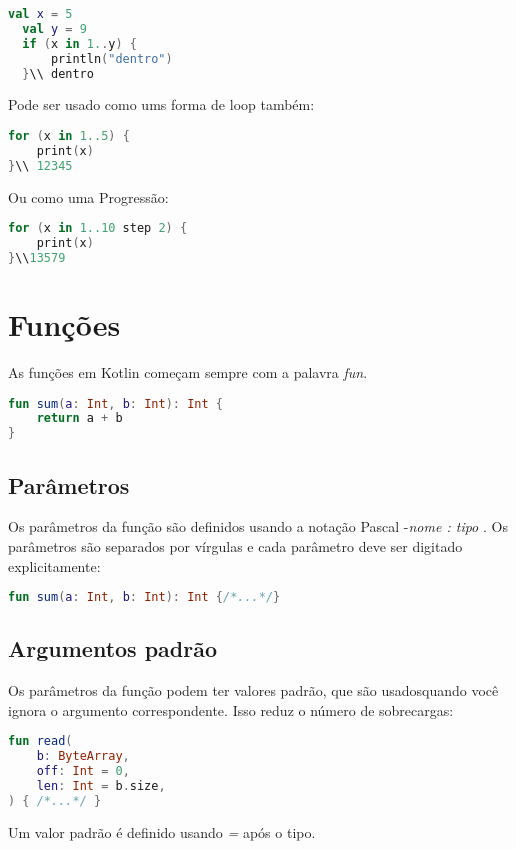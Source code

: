 \begin{lstlisting}[label={lst:example1}, language=Kotlin]
  val x = 5
  val y = 9
  if (x in 1..y) {
      println("dentro")
  }\\ dentro
\end{lstlisting}
Pode ser usado como ums forma de loop também:
\begin{lstlisting}[label={lst:example1}, language=Kotlin]
  for (x in 1..5) {
    print(x)
}\\ 12345
\end{lstlisting}
Ou como uma Progressão:
\begin{lstlisting}[label={lst:example1}, language=Kotlin]
  for (x in 1..10 step 2) {
    print(x)
}\\13579
\end{lstlisting}


\section{Funções}
As funções em Kotlin começam sempre com a palavra \emph{fun}. 
\begin{lstlisting}[label={lst:example1}, language=Kotlin]
  fun sum(a: Int, b: Int): Int {
    return a + b
}
  \end{lstlisting}
\subsection{Parâmetros}
Os parâmetros da função são definidos usando a
notação Pascal -\emph{nome : tipo }. Os parâmetros são separados por vírgulas e cada parâmetro deve ser digitado explicitamente:
\begin{lstlisting}[label={lst:example1}, language=Kotlin]
  fun sum(a: Int, b: Int): Int {/*...*/}
  \end{lstlisting}

\subsection{Argumentos padrão}
Os parâmetros da função podem ter valores padrão, que são usados ​​quando você ignora o argumento correspondente. Isso reduz o número de sobrecargas:
\begin{lstlisting}[label={lst:example1}, language=Kotlin]
  fun read(
    b: ByteArray,
    off: Int = 0,
    len: Int = b.size,
) { /*...*/ }
  \end{lstlisting}
Um valor padrão é definido usando \emph{=} após o tipo.

